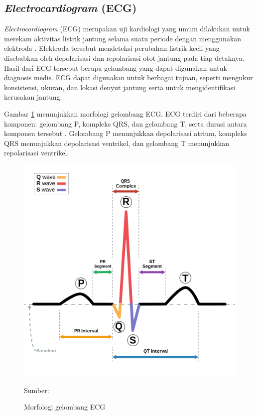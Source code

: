 
\subsection{\emph{Electrocardiogram} (ECG)}
\label{subsec: landasan-ecg}

\textit{Electrocardiogram} (ECG) merupakan uji kardiologi yang umum dilakukan untuk merekam aktivitas listrik jantung selama suatu periode dengan menggunakan elektroda \parencite{yoonDeepLearningbasedElectrocardiogram2019}.
Elektroda tersebut mendeteksi perubahan listrik kecil yang disebabkan oleh depolarisasi dan repolarisasi otot jantung pada tiap detaknya.
Hasil dari ECG tersebut berupa gelombang yang dapat digunakan untuk diagnosis medis.
ECG dapat digunakan untuk berbagai tujuan, seperti mengukur konsistensi, ukuran, dan lokasi denyut jantung serta untuk mengidentifikasi kerusakan jantung.


Gambar \ref{fig: ecg-morphology} menunjukkan morfologi gelombang ECG. ECG terdiri dari beberapa komponen: gelombang P, kompleks QRS, dan gelombang T, serta durasi antara komponen tersebut \parencite{anbalaganAnalysisVariousTechniques2023}.  Gelombang P menunjukkan depolarisasi atrium, kompleks QRS menunjukkan depolarisasi ventrikel, dan gelombang T menunjukkan repolarisasi ventrikel.

\begin{figure}[H]
  \centering
  \includegraphics[width=.5\linewidth]{img/ecg-morphology.png}
  \caption{Morfologi gelombang ECG}
  Sumber: \textcite{wiki:xxx}
  \label{fig: ecg-morphology}
\end{figure}

%

